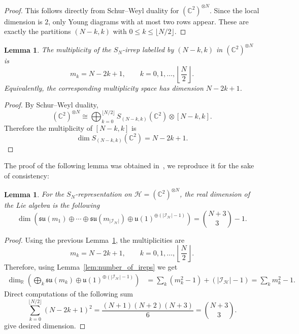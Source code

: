 \documentclass[10pt,twocolumn,superscriptaddress,aps,amsmath,amssymb,citeautoscript,floatfix,prx]{revtex4-2}
\newcounter{alg}
\theoremstyle{plain}
\theoremstyle{plain}
\theoremstyle{plain}
\theoremstyle{plain}
\theoremstyle{plain}
\theoremstyle{plain}
\newcommand{\C}{\mathbb{C}}
\theoremstyle{plain}
\newtheorem{smlemma}[smtheorem]{Lemma}
\theoremstyle{definition}
\theoremstyle{plain}
\begin{document}
\begin{appendix}
\begin{proof}
This follows directly from Schur--Weyl duality for
\((\mathbb C^2)^{\otimes N}\). Since the local dimension is \(2\), only Young
diagrams with at most two rows appear. These are exactly the partitions
\((N-k,k)\) with \(0\leq k\leq \lfloor N/2\rfloor\).
\end{proof}

\begin{smlemma}\label{lem:multipl_dim}
The multiplicity of the \(S_N\)-irrep labelled by \((N-k,k)\) in
\((\mathbb C^2)^{\otimes N}\) is
\[
    m_k=N-2k+1,
    \qquad
    k=0,1,\ldots,\left\lfloor\frac N2\right\rfloor .
\]
Equivalently, the corresponding multiplicity space has dimension \(N-2k+1\).
\end{smlemma}

\begin{proof}
By Schur--Weyl duality,
\[
    (\mathbb C^2)^{\otimes N}
    \cong
    \bigoplus_{k=0}^{\lfloor N/2\rfloor}
    S_{(N-k,k)}(\C^2)
    \otimes
    [N-k, k].
\]
Therefore the multiplicity of \([N-k, k]\) is
\[
    \dim S_{(N-k,k)}(\C^2)=N-2k+1 .
\]
\end{proof}

The proof of the following lemma was obtained in~\cite{Albertini2018}, we reproduce it for the sake of consistency:
\begin{smlemma}\label{lem:Sn_full_dimension}
For the \(S_N\)-representation on \(\mathcal H=(\mathbb C^2)^{\otimes N}\), the real dimension of the Lie algebra is the following
\[
    \dim\left(\mathfrak{su}(m_1)\oplus\cdots\oplus
    \mathfrak{su}(m_{|\mathcal I_{\mathcal H}|})
    \oplus
    \mathfrak{u}(1)^{\oplus(|\mathcal I_{\mathcal H}|-1)}\right)=\binom{N+3}{3}-1.
\]
\end{smlemma}

\begin{proof}
Using the previous Lemma~\ref{lem:multipl_dim}, the multiplicities are
\[
    m_k=N-2k+1,
    \qquad
    k=0,1,\ldots,\left\lfloor\frac N2\right\rfloor .
\]
Therefore, using Lemma~\ref{lem:number_of_ireps} we get
\[
\begin{aligned}
    \dim_{\mathbb R}
    \left(
    \bigoplus_k \mathfrak{su}(m_k)
    \oplus
    \mathfrak{u}(1)^{\oplus(|\mathcal I_{\mathcal H}|-1)}
    \right)
    &=
    \sum_k (m_k^2-1)
    +
    \left(|\mathcal I_{\mathcal H}|-1\right)
    =
    \sum_k m_k^2-1 .
\end{aligned}
\]
Direct computations of the following sum
\[
    \sum_{k=0}^{\lfloor N/2\rfloor}(N-2k+1)^2
    =
    \frac{(N+1)(N+2)(N+3)}{6}
    =
    \binom{N+3}{3}.
\]
give desired dimension.
\end{proof}


\end{appendix}
\end{document}
